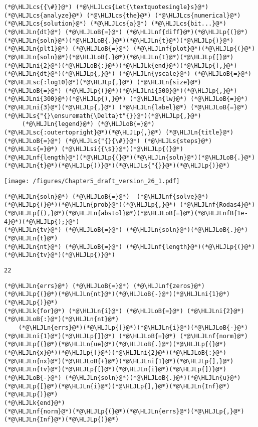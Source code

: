 \documentclass[12pt,landscape]{article}
\newcommand{\HLJLk}[1]{\textcolor[RGB]{148,91,176}{\textbf{#1}}}
\newcommand{\HLJLn}[1]{#1}
\newcommand{\HLJLnf}[1]{\textcolor[RGB]{66,102,213}{#1}}
\newcommand{\HLJLs}[1]{\textcolor[RGB]{201,61,57}{#1}}
\newcommand{\HLJLsc}[1]{\textcolor[RGB]{201,61,57}{#1}}
\newcommand{\HLJLsi}[1]{#1}
\newcommand{\HLJLnfB}[1]{\textcolor[RGB]{59,151,46}{#1}}
\newcommand{\HLJLni}[1]{\textcolor[RGB]{59,151,46}{#1}}
\newcommand{\HLJLoB}[1]{\textcolor[RGB]{102,102,102}{\textbf{#1}}}
\newcommand{\HLJLp}[1]{#1}
\newcommand{\HLJLcs}[1]{\textcolor[RGB]{153,153,119}{\textit{#1}}}
\begin{document}
{\begin{lstlisting}
(*@\HLJLcs{{\#}}@*) (*@\HLJLcs{Let{\textquotesingle}s}@*) (*@\HLJLcs{analyze}@*) (*@\HLJLcs{the}@*) (*@\HLJLcs{numerical}@*) (*@\HLJLcs{solution}@*) (*@\HLJLcs{a}@*) (*@\HLJLcs{bit...}@*)
(*@\HLJLn{dt}@*) (*@\HLJLoB{=}@*) (*@\HLJLnf{diff}@*)(*@\HLJLp{(}@*)(*@\HLJLn{soln}@*)(*@\HLJLoB{.}@*)(*@\HLJLn{t}@*)(*@\HLJLp{)}@*)
(*@\HLJLn{plt1}@*) (*@\HLJLoB{=}@*) (*@\HLJLnf{plot}@*)(*@\HLJLp{(}@*)(*@\HLJLn{soln}@*)(*@\HLJLoB{.}@*)(*@\HLJLn{t}@*)(*@\HLJLp{[}@*)(*@\HLJLni{2}@*)(*@\HLJLoB{:}@*)(*@\HLJLk{end}@*)(*@\HLJLp{],}@*) (*@\HLJLn{dt}@*)(*@\HLJLp{,}@*) (*@\HLJLn{yscale}@*) (*@\HLJLoB{=}@*) (*@\HLJLsc{:log10}@*)(*@\HLJLp{,}@*) (*@\HLJLn{size}@*) (*@\HLJLoB{=}@*) (*@\HLJLp{(}@*)(*@\HLJLni{500}@*)(*@\HLJLp{,}@*) (*@\HLJLni{300}@*)(*@\HLJLp{),}@*) (*@\HLJLn{lw}@*) (*@\HLJLoB{=}@*) (*@\HLJLni{3}@*)(*@\HLJLp{,}@*) (*@\HLJLn{label}@*) (*@\HLJLoB{=}@*) (*@\HLJLs{"{}\ensuremath{\Delta}t"{}}@*)(*@\HLJLp{,}@*) 
     (*@\HLJLn{legend}@*) (*@\HLJLoB{=}@*) (*@\HLJLsc{:outertopright}@*)(*@\HLJLp{,}@*) (*@\HLJLn{title}@*) (*@\HLJLoB{=}@*) (*@\HLJLs{"{}{\#}}@*) (*@\HLJLs{steps}@*) (*@\HLJLs{=}@*) (*@\HLJLsi{{\$}}@*)(*@\HLJLp{(}@*)(*@\HLJLnf{length}@*)(*@\HLJLp{(}@*)(*@\HLJLn{soln}@*)(*@\HLJLoB{.}@*)(*@\HLJLn{t}@*)(*@\HLJLp{))}@*)(*@\HLJLs{"{}}@*)(*@\HLJLp{)}@*)
\end{lstlisting}

\texttt{[image: /figures/Chapter5\_draft\_version\_26\_1.pdf]}

\begin{lstlisting}
(*@\HLJLn{soln}@*) (*@\HLJLoB{=}@*)  (*@\HLJLnf{solve}@*)(*@\HLJLp{(}@*)(*@\HLJLn{prob}@*)(*@\HLJLp{,}@*) (*@\HLJLnf{Rodas4}@*)(*@\HLJLp{(),}@*)(*@\HLJLn{abstol}@*)(*@\HLJLoB{=}@*)(*@\HLJLnfB{1e-4}@*)(*@\HLJLp{);}@*)
(*@\HLJLn{tv}@*) (*@\HLJLoB{=}@*) (*@\HLJLn{soln}@*)(*@\HLJLoB{.}@*)(*@\HLJLn{t}@*)
(*@\HLJLn{nt}@*) (*@\HLJLoB{=}@*) (*@\HLJLnf{length}@*)(*@\HLJLp{(}@*)(*@\HLJLn{tv}@*)(*@\HLJLp{)}@*)
\end{lstlisting}

\begin{lstlisting}
22
\end{lstlisting}


\begin{lstlisting}
(*@\HLJLn{errs}@*) (*@\HLJLoB{=}@*) (*@\HLJLnf{zeros}@*)(*@\HLJLp{(}@*)(*@\HLJLn{nt}@*)(*@\HLJLoB{-}@*)(*@\HLJLni{1}@*)(*@\HLJLp{)}@*)
(*@\HLJLk{for}@*) (*@\HLJLn{i}@*) (*@\HLJLoB{=}@*) (*@\HLJLni{2}@*)(*@\HLJLoB{:}@*)(*@\HLJLn{nt}@*)
    (*@\HLJLn{errs}@*)(*@\HLJLp{[}@*)(*@\HLJLn{i}@*)(*@\HLJLoB{-}@*)(*@\HLJLni{1}@*)(*@\HLJLp{]}@*) (*@\HLJLoB{=}@*) (*@\HLJLnf{norm}@*)(*@\HLJLp{(}@*)(*@\HLJLn{ue}@*)(*@\HLJLoB{.}@*)(*@\HLJLp{(}@*)(*@\HLJLn{x}@*)(*@\HLJLp{[}@*)(*@\HLJLni{2}@*)(*@\HLJLoB{:}@*)(*@\HLJLn{nx}@*)(*@\HLJLoB{+}@*)(*@\HLJLni{1}@*)(*@\HLJLp{],}@*)(*@\HLJLn{tv}@*)(*@\HLJLp{[}@*)(*@\HLJLn{i}@*)(*@\HLJLp{])}@*) (*@\HLJLoB{-}@*) (*@\HLJLn{soln}@*)(*@\HLJLoB{.}@*)(*@\HLJLn{u}@*)(*@\HLJLp{[}@*)(*@\HLJLn{i}@*)(*@\HLJLp{],}@*)(*@\HLJLn{Inf}@*)(*@\HLJLp{)}@*)
(*@\HLJLk{end}@*)
(*@\HLJLnf{norm}@*)(*@\HLJLp{(}@*)(*@\HLJLn{errs}@*)(*@\HLJLp{,}@*)(*@\HLJLn{Inf}@*)(*@\HLJLp{)}@*)
\end{lstlisting}

}
\end{document}
